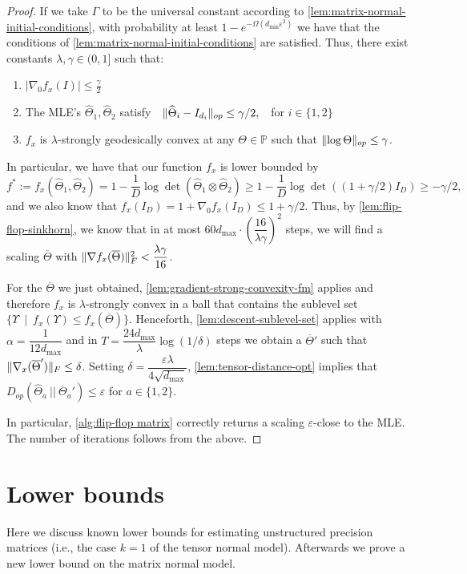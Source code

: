 \documentclass[aos]{imsart}
\theoremstyle{definition}
\numberwithin{equation}{section}
\DeclarePairedDelimiter{\norm}{\lVert}{\rVert}
\newcommand{\otheta}{\overline{\Theta}}
\newcommand{\htheta}{\widehat{\Theta}}
\newcommand{\SPD}{\mathbb{P}}
\def\dmin{d_{\min}}
\def\dmax{d_{\max}}
\begin{document}
\begin{proof}
If we take $\Gamma$ to be the universal constant according to \cref{lem:matrix-normal-initial-conditions}, with probability at least $1 - e^{- \Omega(\dmin \varepsilon^2)}$ we have that the conditions of \cref{lem:matrix-normal-initial-conditions} are satisfied.
Thus, there exist constants $\lambda, \gamma \in (0, 1]$ such that:
\begin{enumerate}
	\item $|\nabla_0 f_x(I)| \leq \frac{\gamma}{2}$
	\item The MLE's $\htheta_1, \htheta_2$ satisfy $\ \ \norm{\htheta_i - I_{d_i}}_{op} \leq \gamma/2, \ \ $ for $i \in \{1,2\}$
	\item $f_x$ is $\lambda$-strongly geodesically convex at any $\Theta \in \SPD$ such that $\norm{\log \Theta}_{op} \leq \gamma$.
\end{enumerate}
In particular, we have that our function $f_x$ is lower bounded by 
$$f^* := f_x(\htheta_1, \htheta_2) = 1 - \dfrac{1}{D} \log\det(\htheta_1 \otimes \htheta_2) \geq 1 - \dfrac{1}{D} \log\det((1+\gamma/2) I_D) \geq - \gamma/2,  $$
and we also know that $f_x(I_D) = 1 + \nabla_0 f_x(I_D) \leq 1 + \gamma/2$.
Thus, by \cref{lem:flip-flop-sinkhorn}, we know that in at most 
$60 \dmax \cdot \left(\dfrac{16}{\lambda \gamma}\right)^2$ steps, we will find a scaling $\otheta$ with $\norm{\nabla f_x(\otheta)}_F^2 < \dfrac{\lambda \gamma}{16}$.

For the $\otheta$ we just obtained, \cref{lem:gradient-strong-convexity-fm} applies and therefore $f_x$ is $\lambda$-strongly convex in a ball that contains the sublevel set $\{ \Upsilon \ \mid \ f_x(\Upsilon) \leq f_x(\otheta) \}$. Henceforth, \cref{lem:descent-sublevel-set} applies with $\alpha = \dfrac{1}{12 \dmax}$ and in $T = \dfrac{24 \dmax}{\lambda} \log(1/\delta)$ steps we obtain a  $\otheta'$ such that $\norm{\nabla_x(\otheta')}_F \leq \delta$. Setting $\delta = \dfrac{\varepsilon \lambda}{4 \sqrt{\dmax}}$, \cref{lem:tensor-distance-opt} implies that $D_{op}(\htheta_a \ || \ \otheta_a') \leq \varepsilon$ for $a \in \{1, 2\}$.


In particular, \cref{alg:flip-flop matrix} correctly returns a scaling $\varepsilon$-close to the MLE. The number of iterations follows from the above.
\end{proof}

\section{Lower bounds}\label{sec:lower}
Here we discuss known lower bounds for estimating unstructured precision matrices (i.e., the case $k= 1$ of the tensor normal model). Afterwards we prove a new lower bound on the matrix normal model.
\end{document}

